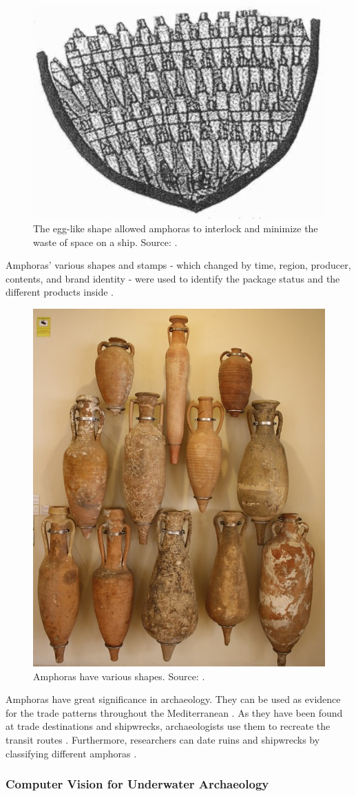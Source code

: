\documentclass[a4paper, 11pt, oneside]{article}
\begin{document}
\begin{figure}[ht]
  \begin{center}
    \includegraphics[width=.4\textwidth]{amphora_stowage_aboard_ship.png}
  \end{center}
  \caption{The egg-like shape allowed amphoras to interlock and minimize the waste of space on a ship.
  Source: \cite{twede2002commercial}.}
\end{figure}

Amphoras' various shapes and stamps - which changed by time, region, producer, contents, and brand
identity - were used to identify the package status and the different products inside
\cite{twede2002commercial, worldhistory}.

\begin{figure}[ht]
  \begin{center}
    \includegraphics[width=.3\textwidth]{amphora_various_shapes.jpg}
  \end{center}
  \caption{Amphoras have various shapes. Source: \cite{worldhistory}.}
  \label{fig:amphora}
\end{figure}

Amphoras have great significance in archaeology. They can be used as evidence for the trade patterns throughout
the Mediterranean \cite{twede2002commercial}. As they have been found at trade destinations and shipwrecks,
archaeologists use them to recreate the transit routes \cite{twede2002commercial}. Furthermore, researchers can date
ruins and shipwrecks by classifying different amphoras \cite{twede2002commercial, grace1985middle}.

\subsubsection{Computer Vision for Underwater Archaeology}
\end{document}
